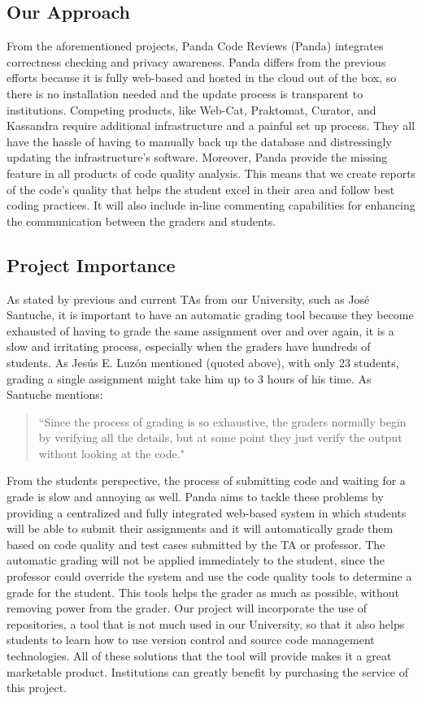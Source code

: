 
\subsection{Our Approach}

From the aforementioned projects, Panda Code Reviews (Panda) integrates
correctness checking and privacy awareness. Panda differs from the previous
efforts because it is fully web-based and hosted in the cloud out of the box, so
there is no installation needed and the update process is transparent to
institutions. Competing products, like Web-Cat, Praktomat, Curator, and
Kassandra require additional infrastructure and a painful set up process. They
all have the hassle of having to manually back up the database and distressingly
updating the infrastructure's software. Moreover, Panda provide the missing
feature in all products of code quality analysis. This means that we create
reports of the code's quality that helps the student excel in their area and
follow best coding practices. It will also include in-line commenting
capabilities for enhancing the communication between the graders and students.

\subsection{Project Importance}

As stated by previous and current TAs from our University, such as José
Santuche, it is important to have an automatic grading tool because they become
exhausted of having to grade the same assignment over and over again, it is a
slow and irritating process, especially when the graders have hundreds of
students. As Jesús E. Luzón mentioned (quoted above), with only 23 students,
grading a single assignment might take him up to 3 hours of his time. As
Santuche mentions: \begin{quote} ``Since the process of grading is so exhaustive,
the graders normally begin by verifying all the details, but at some point they
just verify the output without looking at the code." \end{quote} From the
students perspective, the process of submitting code and waiting for a grade is
slow and annoying as well. Panda aims to tackle these problems by providing a
centralized and fully integrated web-based system in which students will be able
to submit their assignments and it will automatically grade them based on code
quality and test cases submitted by the TA or professor. The automatic grading
will not be applied immediately to the student, since the professor could
override the system and use the code quality tools to determine a grade for the
student. This tools helps the grader as much as possible, without removing power
from the grader. Our project will incorporate the use of repositories, a tool
that is not much used in our University, so that it also helps students to learn
how to use version control and source code management technologies. All of
these solutions that the tool will provide makes it a great marketable product.
Institutions can greatly benefit by purchasing the service of this project.

